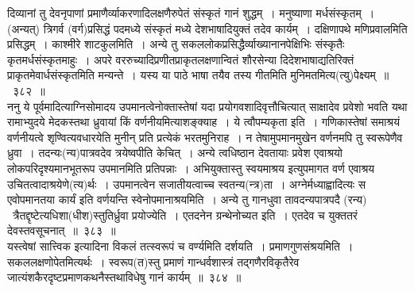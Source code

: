 \documentclass[11pt, openany]{book}
\begin{document}
दिव्यानां तु देवनृपाणां प्रमाणैर्व्याकरणादिलक्षणैरुपेतं {\qtt संस्कृतं गानं} शुद्धम्~। मनुष्याणा {\qtt मर्धसंस्कृतम्~। (अन्यत्) त्रिगर्व (वर्ग)}प्रसिद्धं पदमध्ये संस्कृतं मध्ये देशभाषादियुक्तं तदेव कार्यम्~। {\qtt दक्षिणापथे} मणिप्रवालमिति प्रसिद्धम्~। काश्मीरे शाटकुलमिति~। अन्ये तु सकललोकप्रसिद्धैर्व्याख्यानानपेक्षिभिः {\qtt संस्कृतैः} कृतमर्धसंस्कृतमाहुः~। अपरे वररुच्यादिप्रणीतप्राकृतलक्षणान्वितं शौरसेन्या दिदेशभाषाद्यतिरिक्तं प्राकृतमेवार्धसंस्कृतमिति मन्यन्ते~। यस्य या पाठे भाषा तयैव तस्य गीतमिति मुनिमतमित्य(त्यु)पेक्ष्यम्~॥~३८२~॥\\

ननु ये पूर्वमादित्याग्निसोमादय उपमानत्वेनोक्तास्तेषां यदा प्रयोगवशादिवृत्तौचित्यात् {\qtt साक्षादेव प्रवेशो} भवति यथा रामाभ्युदये मेदकस्तथा ध्रुवायां किं वर्णनीयमित्याशङ्क्याह~। ये त्वौपम्यकृता इति~। गणिकास्तेषां समाश्रयं वर्णनीयत्वे शृण्वित्यवधारयेति मुनीन् प्रति प्रत्येकं भरतमुनिराह~। न तेषामुपमानमुखेन वर्णनमपि तु स्वरूपेणैव ध्रुवा~। तदन्यः(न्य)पात्रवदेव त्रयेष्वपीति केचित्~। अन्ये त्वधिष्ठान देवतायाः प्रवेश एवाश्रयो लोकपरिदृश्यमानभूतरूप उपमानमिति प्रतिपन्नाः~। अभियुक्तास्तु स्वयमाश्रय इत्युपमागत वर्ण एवाश्रय उचितत्वादाश्रयेणे(त्य)र्थः~। उपमानत्वेन सजातीयत्वाच्च स्वतन्य(न्त्र)ता~। अग्नेर्मध्याह्वादित्यः स एवोपमानतया कार्यं इति वर्णयन्ति स्वेनोपमानाश्रयमिति~। अन्ये तु गानधुवा तावदन्यपात्रपदै (रन्य) \textendash\ त्रैतद्दृष्टेत्यधिशा(धीश)स्तुतिर्ध्रुवा प्रयोज्येति~। एतदनेन ग्रन्थेनोच्यत इति~। एतदेव च युक्ततरं देवस्तवसूचनात्~॥~३८३~॥\\

यस्त्वेषां सात्त्विक इत्यादिना विकलं तत्स्वरूपं च वर्ण्यमिति दर्शयति~। {\qtt प्रमाणगुणसंश्रयमिति}~। सकललक्षणोपेतमित्यर्थः~। स्वरूप(त)स्तु प्रमाणं गान्धर्वशास्त्रं तद्गणैरविकृतैरेव जात्यंशकैरदृष्टप्रमाणकथनैस्तथाविधेषु गानं कार्यम्~॥~३८४~॥

\newpage
\end{document}

